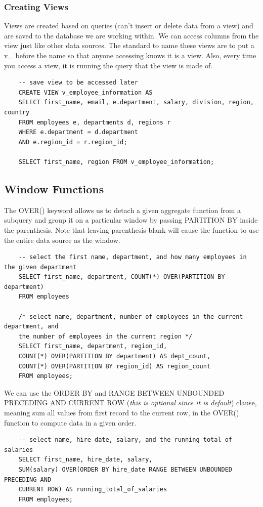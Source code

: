 \documentclass[11pt, a4paper]{article}
\begin{document}
\begin{spacing}{1.1}
	\subsubsection{Creating Views}
	Views are created based on queries (can't insert or delete data from a view) and are saved to the database we are working within. We can access columns from the view just like other data sources. The standard to name these views are to put a v\_ before the name so that anyone accessing knows it is a view. Also, every time you access a view, it is running the query that the view is made of. 
	\begin{lstlisting}
	-- save view to be accessed later
	CREATE VIEW v_employee_information AS
	SELECT first_name, email, e.department, salary, division, region, country
	FROM employees e, departments d, regions r
	WHERE e.department = d.department
	AND e.region_id = r.region_id;
	
	SELECT first_name, region FROM v_employee_information;	\end{lstlisting} \vspace*{3mm}
	
	\subsection{Window Functions}
	The OVER() keyword allows us to detach a given aggregate function from a subquery and group it on a particular window by passing PARTITION BY inside the parenthesis. Note that leaving parenthesis blank will cause the function to use the entire data source as the window.
	\begin{lstlisting}
	-- select the first name, department, and how many employees in the given department
	SELECT first_name, department, COUNT(*) OVER(PARTITION BY department)
	FROM employees
	
	/* select name, department, number of employees in the current department, and 
	the number of employees in the current region */
	SELECT first_name, department, region_id,
	COUNT(*) OVER(PARTITION BY department) AS dept_count,
	COUNT(*) OVER(PARTITION BY region_id) AS region_count
	FROM employees;	\end{lstlisting} \newpage
	\noindent We can use the ORDER BY and RANGE BETWEEN UNBOUNDED PRECEDING AND CURRENT ROW (\textit{this is optional since it is default}) clause, meaning sum all values from first record to the current row, in the OVER() function to compute data in a given order. 
	\begin{lstlisting}
	-- select name, hire date, salary, and the running total of salaries 
	SELECT first_name, hire_date, salary,
	SUM(salary) OVER(ORDER BY hire_date RANGE BETWEEN UNBOUNDED PRECEDING AND 
	CURRENT ROW) AS running_total_of_salaries
	FROM employees;
	

\end{lstlisting}
\end{spacing}
\end{document}

